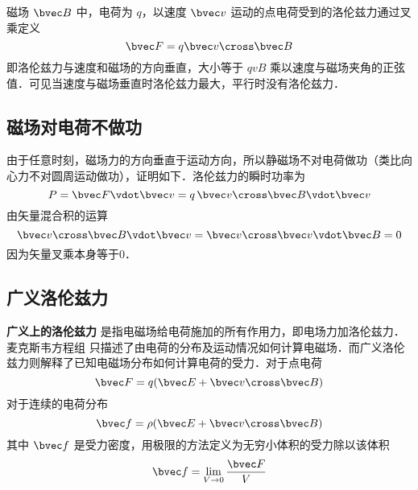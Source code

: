 
磁场 $\bvec B$ 中，电荷为 $q$，以速度 $\bvec v$ 运动的点电荷受到的洛伦兹力通过叉乘定义
\begin{equation}
\bvec F = q\bvec v \cross \bvec B
\end{equation}
即洛伦兹力与速度和磁场的方向垂直，大小等于 $qvB$ 乘以速度与磁场夹角的正弦值．可见当速度与磁场垂直时洛伦兹力最大，平行时没有洛伦兹力．

\subsection{磁场对电荷不做功}
由于任意时刻，磁场力的方向垂直于运动方向，所以静磁场不对电荷做功（类比向心力不对圆周运动做功），证明如下．洛伦兹力的瞬时功率为
\begin{equation}
P = \bvec F \vdot \bvec v = q\,\bvec v \cross \bvec B \vdot \bvec v
\end{equation}
由矢量混合积的运算 %
\begin{equation}
\bvec v \cross \bvec B \vdot \bvec v = \bvec v \cross \bvec v \vdot \bvec B = 0
\end{equation}
因为矢量叉乘本身等于0．


\subsection{广义洛伦兹力}
\textbf{广义上的洛伦兹力} 是指电磁场给电荷施加的所有作用力，即电场力加洛伦兹力．麦克斯韦方程组%
只描述了由电荷的分布及运动情况如何计算电磁场．而广义洛伦兹力则解释了已知电磁场分布如何计算电荷的受力．对于点电荷
\begin{equation}
\bvec F = q (\bvec E + \bvec v \cross \bvec B)
\end{equation}
对于连续的电荷分布
\begin{equation}
\bvec f = \rho(\bvec E + \bvec v \cross \bvec B)
\end{equation}
其中 $\bvec f$ 是受力密度，用极限的方法定义为无穷小体积的受力除以该体积
\begin{equation}
\bvec f = \lim_{V \to 0} \frac{\bvec F}{V}
\end{equation}

